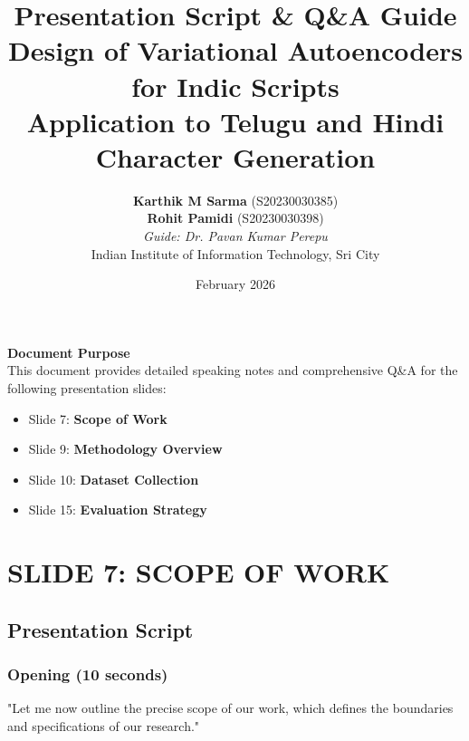 \documentclass[11pt,a4paper]{article}
\title{
    \vspace{-2cm}
    {\Huge\textbf{Presentation Script \& Q\&A Guide}}\\[0.5cm]
    {\Large Design of Variational Autoencoders for Indic Scripts}\\[0.3cm]
    {\large Application to Telugu and Hindi Character Generation}
}
\author{
    \textbf{Karthik M Sarma} (S20230030385)\\
    \textbf{Rohit Pamidi} (S20230030398)\\[0.5cm]
    \textit{Guide: Dr. Pavan Kumar Perepu}\\[0.3cm]
    Indian Institute of Information Technology, Sri City
}
\date{February 2026}
\begin{document}
\maketitle
\thispagestyle{empty}

\vspace{1cm}

\begin{center}
\begin{tcolorbox}[width=0.9\textwidth,colback=lightgray,colframe=primaryblue,boxrule=2pt]
\centering
\textbf{\large Document Purpose}\\[0.3cm]
This document provides detailed speaking notes and comprehensive Q\&A for the following presentation slides:
\begin{itemize}[leftmargin=2cm]
    \item Slide 7: \textbf{Scope of Work}
    \item Slide 9: \textbf{Methodology Overview}
    \item Slide 10: \textbf{Dataset Collection}
    \item Slide 15: \textbf{Evaluation Strategy}
\end{itemize}
\end{tcolorbox}
\end{center}

\clearpage

\tableofcontents

\clearpage

\section{SLIDE 7: SCOPE OF WORK}

\subsection{Presentation Script}

\subsubsection*{Opening (10 seconds)}
\begin{scriptbox}
"Let me now outline the precise scope of our work, which defines the boundaries and specifications of our research."
\end{scriptbox}
\end{document}
